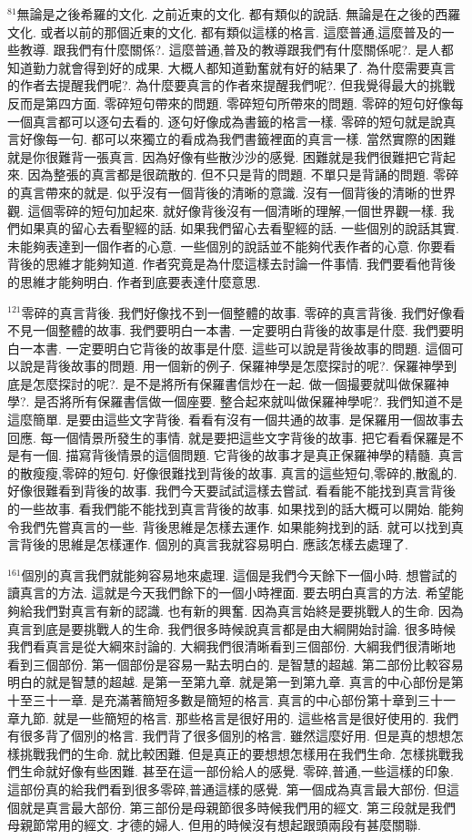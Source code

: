 \documentclass{book}
\begin{document}
$^{81}$無論是之後希羅的文化.
之前近東的文化.
都有類似的說話.
無論是在之後的西羅文化.
或者以前的那個近東的文化.
都有類似這樣的格言.
這麼普通,這麼普及的一些教導.
跟我們有什麼關係?.
這麼普通,普及的教導跟我們有什麼關係呢?.
是人都知道勤力就會得到好的成果.
大概人都知道勤奮就有好的結果了.
為什麼需要真言的作者去提醒我們呢?.
為什麼要真言的作者來提醒我們呢?.
但我覺得最大的挑戰反而是第四方面.
零碎短句帶來的問題.
零碎短句所帶來的問題.
零碎的短句好像每一個真言都可以逐句去看的.
逐句好像成為書籤的格言一樣.
零碎的短句就是說真言好像每一句.
都可以來獨立的看成為我們書籤裡面的真言一樣.
當然實際的困難就是你很難背一張真言.
因為好像有些散沙沙的感覺.
困難就是我們很難把它背起來.
因為整張的真言都是很疏散的.
但不只是背的問題.
不單只是背誦的問題.
零碎的真言帶來的就是.
似乎沒有一個背後的清晰的意識.
沒有一個背後的清晰的世界觀.
這個零碎的短句加起來.
就好像背後沒有一個清晰的理解,一個世界觀一樣.
我們如果真的留心去看聖經的話.
如果我們留心去看聖經的話.
一些個別的說話其實.
未能夠表達到一個作者的心意.
一些個別的說話並不能夠代表作者的心意.
你要看背後的思維才能夠知道.
作者究竟是為什麼這樣去討論一件事情.
我們要看他背後的思維才能夠明白.
作者到底要表達什麼意思.

$^{121}$零碎的真言背後.
我們好像找不到一個整體的故事.
零碎的真言背後.
我們好像看不見一個整體的故事.
我們要明白一本書.
一定要明白背後的故事是什麼.
我們要明白一本書.
一定要明白它背後的故事是什麼.
這些可以說是背後故事的問題.
這個可以說是背後故事的問題.
用一個新的例子.
保羅神學是怎麼探討的呢?.
保羅神學到底是怎麼探討的呢?.
是不是將所有保羅書信炒在一起.
做一個撮要就叫做保羅神學?.
是否將所有保羅書信做一個座要.
整合起來就叫做保羅神學呢?.
我們知道不是這麼簡單.
是要由這些文字背後.
看看有沒有一個共通的故事.
是保羅用一個故事去回應.
每一個情景所發生的事情.
就是要把這些文字背後的故事.
把它看看保羅是不是有一個.
描寫背後情景的這個問題.
它背後的故事才是真正保羅神學的精髓.
真言的散瘦瘦,零碎的短句.
好像很難找到背後的故事.
真言的這些短句,零碎的,散亂的.
好像很難看到背後的故事.
我們今天要試試這樣去嘗試.
看看能不能找到真言背後的一些故事.
看我們能不能找到真言背後的故事.
如果找到的話大概可以開始.
能夠令我們先嘗真言的一些.
背後思維是怎樣去運作.
如果能夠找到的話.
就可以找到真言背後的思維是怎樣運作.
個別的真言我就容易明白.
應該怎樣去處理了.

$^{161}$個別的真言我們就能夠容易地來處理.
這個是我們今天餘下一個小時.
想嘗試的讀真言的方法.
這就是今天我們餘下的一個小時裡面.
要去明白真言的方法.
希望能夠給我們對真言有新的認識.
也有新的興奮.
因為真言始終是要挑戰人的生命.
因為真言到底是要挑戰人的生命.
我們很多時候說真言都是由大綱開始討論.
很多時候我們看真言是從大綱來討論的.
大綱我們很清晰看到三個部份.
大綱我們很清晰地看到三個部份.
第一個部份是容易一點去明白的.
是智慧的超越.
第二部份比較容易明白的就是智慧的超越.
是第一至第九章.
就是第一到第九章.
真言的中心部份是第十至三十一章.
是充滿著簡短多數是簡短的格言.
真言的中心部份第十章到三十一章九節.
就是一些簡短的格言.
那些格言是很好用的.
這些格言是很好使用的.
我們有很多背了個別的格言.
我們背了很多個別的格言.
雖然這麼好用.
但是真的想想怎樣挑戰我們的生命.
就比較困難.
但是真正的要想想怎樣用在我們生命.
怎樣挑戰我們生命就好像有些困難.
甚至在這一部份給人的感覺.
零碎,普通,一些這樣的印象.
這部份真的給我們看到很多零碎,普通這樣的感覺.
第一個成為真言最大部份.
但這個就是真言最大部份.
第三部份是母親節很多時候我們用的經文.
第三段就是我們母親節常用的經文.
才德的婦人.
但用的時候沒有想起跟頭兩段有甚麼關聯.
\end{document}
